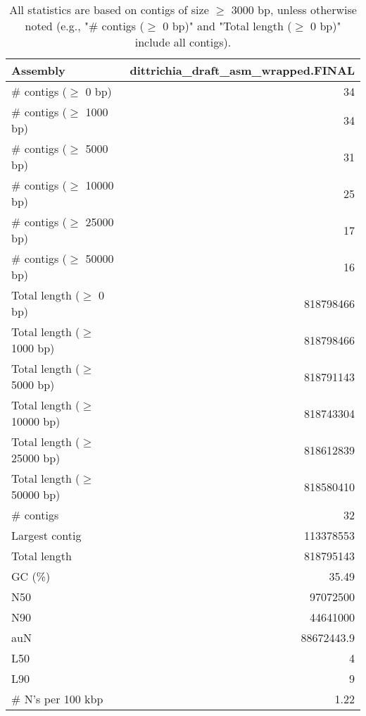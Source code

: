 \documentclass[12pt,a4paper]{article}
\begin{document}
\begin{table}[ht]
\begin{center}
\caption{All statistics are based on contigs of size $\geq$ 3000 bp, unless otherwise noted (e.g., "\# contigs ($\geq$ 0 bp)" and "Total length ($\geq$ 0 bp)" include all contigs).}
\begin{tabular}{|l*{1}{|r}|}
\hline
Assembly & dittrichia\_draft\_asm\_wrapped.FINAL \\ \hline
\# contigs ($\geq$ 0 bp) & 34 \\ \hline
\# contigs ($\geq$ 1000 bp) & 34 \\ \hline
\# contigs ($\geq$ 5000 bp) & 31 \\ \hline
\# contigs ($\geq$ 10000 bp) & 25 \\ \hline
\# contigs ($\geq$ 25000 bp) & 17 \\ \hline
\# contigs ($\geq$ 50000 bp) & 16 \\ \hline
Total length ($\geq$ 0 bp) & 818798466 \\ \hline
Total length ($\geq$ 1000 bp) & 818798466 \\ \hline
Total length ($\geq$ 5000 bp) & 818791143 \\ \hline
Total length ($\geq$ 10000 bp) & 818743304 \\ \hline
Total length ($\geq$ 25000 bp) & 818612839 \\ \hline
Total length ($\geq$ 50000 bp) & 818580410 \\ \hline
\# contigs & 32 \\ \hline
Largest contig & 113378553 \\ \hline
Total length & 818795143 \\ \hline
GC (\%) & 35.49 \\ \hline
N50 & 97072500 \\ \hline
N90 & 44641000 \\ \hline
auN & 88672443.9 \\ \hline
L50 & 4 \\ \hline
L90 & 9 \\ \hline
\# N's per 100 kbp & 1.22 \\ \hline
\end{tabular}
\end{center}
\end{table}
\end{document}
